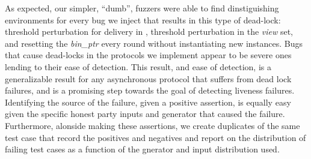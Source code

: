 
As expected, our simpler, ``dumb'', fuzzers were able to find dinstiguishing environments for every bug we inject that results in this type of dead-lock: threshold perturbation for delivery in , threshold perturbation in the \emph{view} set, and resetting the \emph{bin\_ptr} every round without instantiating new  instances.
Bugs that cause dead-locks in the protocols we implement appear to be severe ones lending to their ease of detection. 
This result, and ease of detection, is a generalizable result for any asynchronous protocol that suffers from dead lock failures, and is a promising step towards the goal of detecting liveness failures.
Identifying the source of the failure, given a positive assertion, is equally easy given the specific honest party inputs and generator that caused the failure.
Furthermore, alonside making these assertions, we create duplicates of the same test case that record the positives and negatives and report on the distribution of failing test cases as a function of the gnerator and input distribution used.

